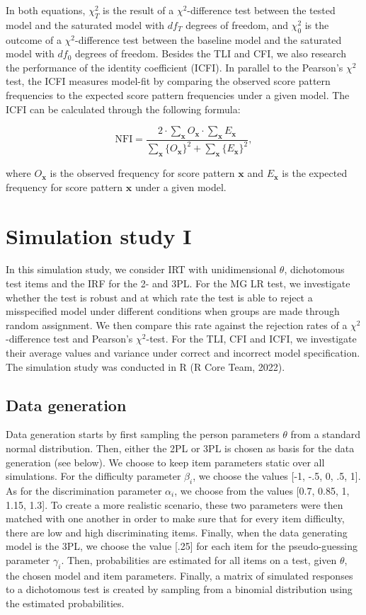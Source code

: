 \documentclass[Royal,sageapa,times,doublespace]{sagej}
\begin{document}
In both equations, $\chi^{2}_{T}$ is the result of a $\chi^2$-difference test between the tested model and the saturated model with $df_T$ degrees of freedom, and $\chi^{2}_{0}$ is the outcome of a $\chi^2$-difference test between the baseline model and the saturated model with $df_0$ degrees of freedom. Besides the TLI and CFI, we also research the performance of the identity coefficient (ICFI). In parallel to the Pearson's $\chi^2$ test, the ICFI measures model-fit by comparing the observed score pattern frequencies to the expected score pattern frequencies under a given model. The ICFI can be calculated through the following formula: 

\begin{equation}
\text{NFI} = \frac{2 \cdot \sum_{\boldsymbol{x}} O_{\boldsymbol{x}} \cdot \sum_{\boldsymbol{x}} E_{\boldsymbol{x}}}{  \sum_{\boldsymbol{x}} \{ O_{\boldsymbol{x}}\}^2 +  \sum_{\boldsymbol{x}} \{ E_{\boldsymbol{x}} \}^2 },
\end{equation}

where $O_{\boldsymbol{x}}$ is the observed frequency for score pattern $\boldsymbol{x}$ and $E_{\boldsymbol{x}}$ is the expected frequency for score pattern $\boldsymbol{x}$ under a given model. 

\section{Simulation study I}

In this simulation study, we consider IRT with unidimensional $\theta$, dichotomous test items and the IRF for the 2- and 3PL. For the MG LR test, we investigate whether the test is robust and at which rate the test is able to reject a misspecified model under different conditions when groups are made through random assignment. We then compare this rate against the rejection rates of a $\chi^2$-difference test and Pearson's $\chi^2$-test. For the TLI, CFI and ICFI, we investigate their average values and variance under correct and incorrect model specification. The simulation study was conducted in R (R Core Team, 2022).
\subsection{Data generation}
Data generation starts by first sampling the person parameters $\theta$ from a standard normal distribution. Then, either the 2PL or 3PL is chosen as basis for the data generation (see below). We choose to keep item parameters static over all simulations. For the difficulty parameter $\beta_i$, we choose the values [-1, -.5, 0, .5, 1]. As for the discrimination parameter $\alpha_i$, we choose from the values [0.7, 0.85, 1, 1.15, 1.3]. To create a more realistic scenario, these two parameters were then matched with one another in order to make sure that for every item difficulty, there are low and high discriminating items. Finally, when the data generating model is the 3PL, we choose the value [.25] for each item for the pseudo-guessing parameter $\gamma_i$. Then, probabilities are estimated for all items on a test, given $\theta$, the chosen model and item parameters. Finally, a matrix of simulated responses to a dichotomous test is created by sampling from a binomial distribution using the estimated probabilities. 
\end{document}

